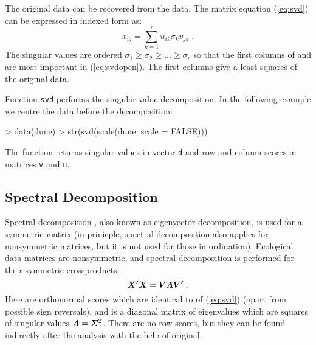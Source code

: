 The original data can be recovered from the data. The matrix equation
(\ref{eq:svd}) can be expressed in indexed form as:
\begin{equation}
  \label{eq:svdopen}
  x_{ij} = \sum_{k=1}^r u_{ik} \sigma_{k} v_{jk} \;.
\end{equation}
The singular values are ordered $\sigma_1 \geq \sigma_2 \geq \dots
\geq \sigma_r$ so that the first columns of  and  are
most important in (\ref{eq:svdopen}). The first columns give a
least squares of the original data.

Function \texttt{svd} performs the singular value decomposition. In
the following example we centre the data before the decomposition:

\begin{Schunk}
\begin{Sinput}
> data(dune)
> str(svd(scale(dune, scale = FALSE)))
\end{Sinput}
\end{Schunk}
The function returns singular values in vector \texttt{d} and row
and column scores in matrices \texttt{v} and \texttt{u}.

\subsection{Spectral Decomposition}

Spectral decomposition \citep{Mard79}, also known as eigenvector
decomposition, is used for a symmetric matrix (in prinicple, spectral
decomposition also applies for nonsymmetric matrices, but it is not
used for those in ordination). Ecological data matrices are
nonsymmetric, and spectral decomposition is performed for their
symmetric crossproducts:
\begin{equation}
  \label{eq:eigen}
  \vec{X'X} = \vec{V \bLambda V'}\;.
\end{equation}
Here  are orthonormal scores which are identical to  of
(\ref{eq:svd}) (apart from possible sign reversals), and
\vec{\bLambda} is a diagonal matrix of eigenvalues which are squares
of singular values $\vec{\bLambda} = \vec{\bSigma}^2$. There are no
row scores, but they can be found indirectly after the analysis with
the help of original .

